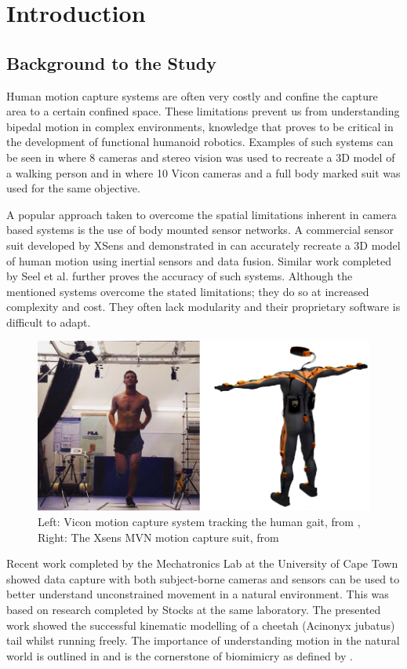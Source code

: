 \chapter{Introduction}

\section{Background to the Study}
Human motion capture systems are often very costly and confine the capture area to a certain confined space. These limitations prevent us from understanding bipedal motion in complex environments, knowledge that proves to be critical in the development of functional humanoid robotics. Examples of such systems can be seen in \cite{sandau2014markerless} where 8 cameras and stereo vision was used to recreate a 3D model of a walking person and in \cite{pfister2014comparative} where 10 Vicon cameras and a full body marked suit was used for the same objective.

A popular approach taken to overcome the spatial limitations inherent in camera based systems is the use of body mounted sensor networks. A commercial sensor suit developed by XSens and demonstrated in \cite{roetenberg2009xsens} can accurately recreate a 3D model of human motion using inertial sensors and data fusion. Similar work completed by Seel et al. \cite{seel2014imu} further proves the accuracy of such systems. Although the mentioned systems overcome the stated limitations; they do so at increased complexity and cost. They often lack modularity and their proprietary software is difficult to adapt.

\begin{figure}[!ht] 
\captionsetup{width=0.8\linewidth, font=small}  
\includegraphics[width=0.5\linewidth]{figures/COMBO.png}
\caption{Left: Vicon motion capture system tracking the human gait, from \cite{roetenberg2009xsens}, Right: The Xsens MVN motion capture suit, from \cite{vicon}}
\label{fig:COMBO}
\end{figure}

Recent work \cite{patel2017trackingieee} completed by the Mechatronics Lab at the University of Cape Town showed data capture with both subject-borne cameras and sensors can be used to better understand unconstrained movement in a natural environment. This was based on research completed by Stocks \cite{bradstocks} at the same laboratory. The presented work showed the successful kinematic modelling of a cheetah (Acinonyx jubatus) tail whilst running freely. The importance of understanding motion in the natural world is outlined in \cite{patel2014rapid} and is the cornerstone of biomimicry as defined by \cite{benyus2002biomimicry}.

